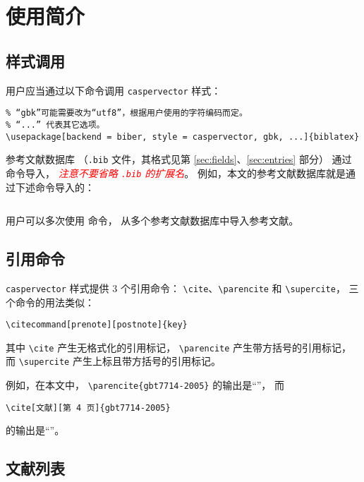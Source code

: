 \documentclass[UTF8, fancyhdr, hyperref]{ctexart}
\newcommand{\myemph}[1]{\emph{\textcolor{red}{#1}}}
\begin{document}
\section{使用简介}
\subsection{样式调用}

用户应当通过以下命令调用 \verb|caspervector| 样式：
\begin{Verbatim}[frame = single]
% 如果系统上无法使用 biber，可将“biber”改为“bibtex”。
% “gbk”可能需要改为“utf8”，根据用户使用的字符编码而定。
% “...” 代表其它选项。
\usepackage[backend = biber, style = caspervector, gbk, ...]{biblatex}
\end{Verbatim}

参考文献数据库
（\verb|.bib| 文件，其格式见第 \ref{sec:fields}、\ref{sec:entries} 部分）
通过 \verb|| 命令导入，%
\myemph{注意不要省略 \texttt{.bib} 的扩展名}。
例如，本文的参考文献数据库就是通过下述命令导入的：
\begin{Verbatim}[frame = single]

\end{Verbatim}
用户可以多次使用 \verb|| 命令，
从多个参考文献数据库中导入参考文献。

\subsection{引用命令}

\verb|caspervector| 样式提供 3 个引用命令：
\verb|\cite|、\verb|\parencite| 和 \verb|\supercite|，
三个命令的用法类似：
\begin{Verbatim}[frame = single]
% 可选参数 prenote 和 postnote 分别用于设定引用记号前、后的注释。
\citecommand[prenote][postnote]{key}
\end{Verbatim}
其中 \verb|\cite| 产生无格式化的引用标记，
\verb|\parencite| 产生带方括号的引用标记，
而 \verb|\supercite| 产生上标且带方括号的引用标记。

例如，在本文中，%
\verb|\parencite{gbt7714-2005}| 的输出是“\parencite{gbt7714-2005}”，
而
\begin{Verbatim}[frame = single]
\cite[文献][第 4 页]{gbt7714-2005}
\end{Verbatim}
的输出是“\cite[文献][第 4 页]{gbt7714-2005}”。

\subsection{文献列表}
\end{document}
